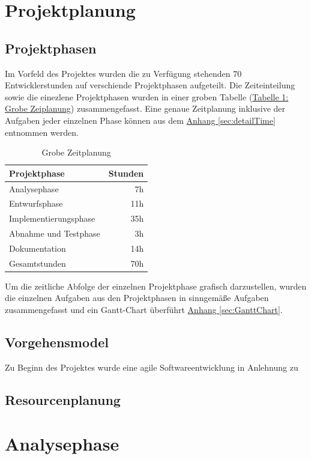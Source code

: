\documentclass[oneside]{article}
\begin{document}
  \section{Projektplanung}
  \subsection{Projektphasen}
    Im Vorfeld des Projektes wurden die zu Verfügung stehenden 70 Entwicklerstunden auf verschiende Projektphasen aufgeteilt. Die Zeiteinteilung sowie die einezlene Projektphasen wurden in einer groben Tabelle (\hyperref[tab:timing]{Tabelle 1: Grobe Zeiplanung}) zusammengefasst.
    Eine genaue Zeitplanung inklusive der Aufgaben jeder einzelnen Phase können aus dem \hyperref[sec:detailTime]{Anhang \ref{sec:detailTime}} entnommen werden.
    \begin{table}[h]
      \label{tab:timing}
      \centering
    \begin{tabular}{| l | r |}
      \rowcolor{carolinablue}
      Projektphase & Stunden \\
      \hline
      Analysephase & 7h \\
      \hline
      \rowcolor{lightgray}
      Entwurfsphase & 11h\\
      \hline
      Implementierungsphase & 35h\\
      \hline
      \rowcolor{lightgray}
      Abnahme und Testphase & 3h\\
      \hline
      Dokumentation & 14h \\
      \hline
      \rowcolor{carolinablue}
      Gesamtstunden & 70h
    \end{tabular}
    \caption{Grobe Zeitplanung}
  \end{table}
    Um die zeitliche Abfolge der einzelnen Projektphase grafisch darzustellen, wurden die einzelnen Aufgaben aus den Projektphasen in sinngemäße Aufgaben zusammengefasst und ein Gantt-Chart überführt \hyperref[sec:GanttChart]{Anhang \ref{sec:GanttChart}}.
  \subsection{Vorgehensmodel}
    Zu Beginn des Projektes wurde eine agile Softwareentwicklung in Anlehnung zu
  \subsection{Resourcenplanung}
  \section{Analysephase}
\end{document}
